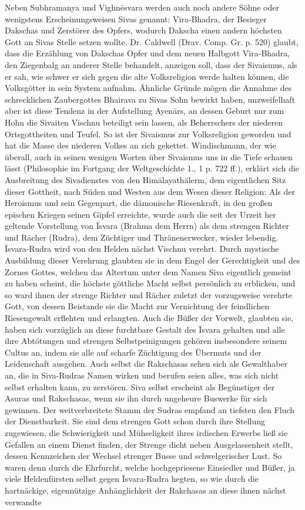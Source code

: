 \documentclass{article}
\begin{document}
Neben Subhramanya und Vighn\={e}svara werden auch noch andere Söhne oder wenigstens Erscheinungsweisen Sivas genannt: V\={i}ra-Bhadra, der Besieger Dakschas und Zerstörer des Opfers, wodurch Dakscha einen andern höchsten Gott an Sivas Stelle setzen wollte. Dr. Caldwell (Drav. Comp. Gr. p. 520) glaubt, dass die Erzählung von Dakschas Opfer und dem neuen Halbgott V\={i}ra-Bhadra, den Ziegenbalg an anderer Stelle behandelt, anzeigen soll, dass der Sivaismus, als er sah, wie schwer er sich gegen die alte Volksreligion werde halten können, die Volksgötter in sein System aufnahm. Ähnliche Gründe mögen die Annahme des schrecklichen Zaubergottes Bhairava zu Sivas Sohn bewirkt haben, unzweifelhaft aber ist diese Tendenz in der Aufstellung Ayen\={a}rs, an dessen Geburt nur zum Hohn die Sivaiten Vischnu beteiligt sein lassen, als Beherrschers der niederen Ortsgottheiten und Teufel. So ist der Sivaismus zur Volksreligion geworden und hat die Masse des niederen Volkes an sich gekettet. Windischmann, der wie überall, auch in seinen wenigen Worten über Sivaismus uns in die Tiefe schauen lässt (Philosophie im Fortgang der Weltgeschichte 1., 1 p. 722 ff.), erklärt sich die Ausbreitung des Sivadienstes von den Him\={a}layathälerm, dem eigentlichen Sitz dieser Gottheit, nach Süden und Westen aus dem Wesen dieser Religion: Als der Heroismus und sein Gegenpart, die dämonische Riesenkraft, in den großen epischen Kriegen seinen Gipfel erreichte, wurde auch die seit der Urzeit her geltende Vorstellung von \={I}svara (Brahma dem Herrn) als dem strengen Richter und Rächer (Rudra), dem Züchtiger und Thränenerwecker, wieder lebendig. \={I}svara-Rudra wird von den Helden nächst Vischnu verehrt. Durch mystische Ausbildung dieser Verehrung glaubten sie in dem Engel der Gerechtigkeit und des Zornes Gottes, welchen das Altertum unter dem Namen Siva eigentlich gemeint zu haben scheint, die höchste göttliche Macht selbst persönlich zu erblicken, und so ward ihnen der strenge Richter und Rächer zuletzt der vorzugsweise verehrte Gott, von dessen Beistande sie die Macht zur Vernichtung der feindlichen Riesengewalt erflehten und erlangten. Auch die Büßer der Vorwelt, glaubten sie, haben sich vorzüglich an diese furchtbare Gestalt des \={I}svara gehalten und alle ihre Abtötungen und strengen Selbstpeinigungen gehören insbesondere seinem Cultus an, indem sie alle auf scharfe Züchtigung des Übermuts und der Leidenschaft ausgehen. Auch selbst die Rakschasas sehen sich als Gewalthaber an, die in Siva-Rudras Namen wirken und berufen seien alles, was sich nicht selbst erhalten kann, zu zerstören. Siva selbst erscheint als Begünstiger der Asuras und Rakschasas, wenn sie ihn durch ungeheure Buswerke für sich gewinnen. Der weitverbreitete Stamm der Sudras empfand an tiefsten den Fluch der Dienstbarkeit. Sie sind dem strengen Gott schon durch ihre Stellung zugewiesen, die Schwierigkeit und Mühseligkeit ihres irdischen Erwerbs ließ sie Gefallen an einem Dienst finden, der Strenge dicht neben Ausgelassenheit stellt, dessen Kennzeichen der Wechsel strenger Busse und schwelgerischer Lust. So waren denn durch die Ehrfurcht, welche hochgepriesene Einsiedler und Büßer, ja viele Heldenfürsten selbst gegen \={I}svara-Rudra hegten, so wie durch die hartnäckige, eigennützige Anhänglichkeit der Rakchasas an diese ihnen nächst verwandte 
\end{document}
